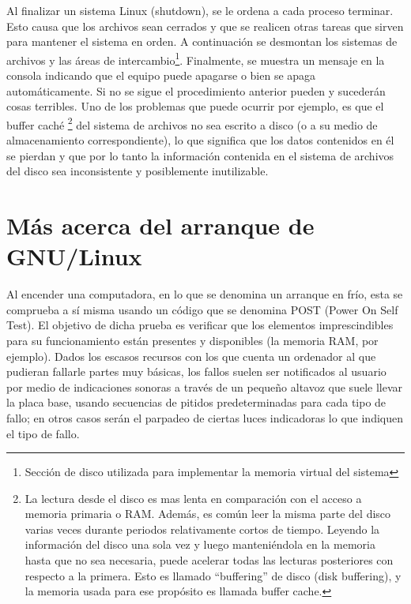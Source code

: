 \documentclass[12pt]{article}
\begin{document}
 Al finalizar un sistema Linux (shutdown), se le ordena a cada proceso
terminar. Esto causa que los archivos sean cerrados y que se realicen otras
tareas que sirven para mantener el sistema en orden. A continuación se desmontan
los sistemas de archivos y las áreas de intercambio\footnote{Sección de disco utilizada 
para implementar la memoria virtual del sistema}. Finalmente, se muestra un mensaje
en la consola indicando que el equipo puede apagarse o bien se apaga automáticamente. 
Si no se sigue el procedimiento anterior pueden y sucederán cosas terribles. Uno de los problemas 
que puede ocurrir por ejemplo, es que el buffer caché
\footnote{La lectura desde el disco es mas lenta en comparación con el acceso a 
memoria primaria o RAM. Además, es común leer la misma parte del disco varias 
veces durante periodos relativamente cortos de tiempo. Leyendo la información del
disco una sola vez y luego manteniéndola en la memoria hasta que no sea necesaria,
puede acelerar todas las lecturas posteriores con respecto a la primera. Esto es 
llamado ``buffering'' de disco (disk buffering), y la memoria usada para ese propósito 
es llamada buffer cache.}
 del sistema de archivos no sea escrito a
disco (o a su medio de almacenamiento correspondiente), lo que significa que los
datos contenidos en él se pierdan y que por lo tanto la información contenida en
el sistema de archivos del disco sea inconsistente y posiblemente inutilizable.

\section{Más acerca del arranque de GNU/Linux}

Al encender una computadora, en lo que se denomina un arranque en frío, esta se
comprueba a sí misma usando un código que se denomina POST (Power On Self
Test). El objetivo de dicha prueba es verificar que los elementos imprescindibles
para su funcionamiento están presentes y disponibles (la memoria RAM, por
ejemplo). Dados los escasos recursos con los que cuenta un ordenador
al que pudieran fallarle partes muy básicas, los fallos suelen ser notificados al
usuario por medio de indicaciones sonoras a través de un pequeño altavoz que
suele llevar la placa base, usando secuencias de pitidos predeterminadas para
cada tipo de fallo; en otros casos serán el parpadeo de ciertas luces indicadoras
lo que indiquen el tipo de fallo. 
\end{document}
